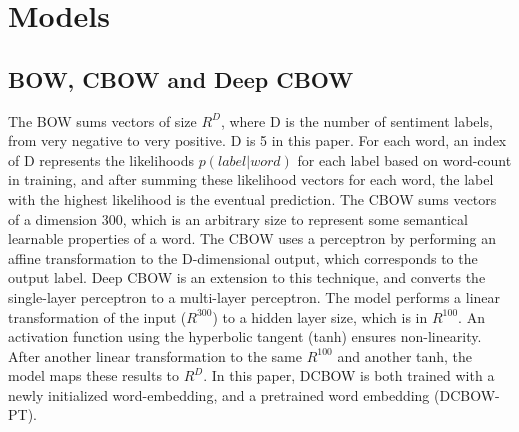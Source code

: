 \section{Models}
\label{sec: models}
\subsection{BOW, CBOW and Deep CBOW}
The BOW sums vectors of size $R^{D}$, where D is the number of sentiment labels,
from very negative to very positive. D is 5 in this paper. For each word, an
index of D represents the likelihoods $p(label|word)$ for each label based on
word-count in training, and after summing these likelihood vectors for each
word, the label with the highest likelihood is the eventual prediction. The CBOW
sums vectors of a dimension 300, which is an arbitrary size to represent some
semantical learnable properties of a word. The CBOW uses a perceptron by
performing an affine transformation to the D-dimensional output, which
corresponds to the output label. Deep CBOW is an extension to this technique,
and converts the single-layer perceptron to a multi-layer perceptron. The model
performs a linear transformation of the input ($R^{300}$) to a hidden layer
size, which is in $R^{100}$. An activation function using the hyperbolic tangent
(tanh) ensures non-linearity. After another linear transformation to the same
$R^{100}$ and another tanh, the model maps these results to $R^D$. In this
paper, DCBOW is both trained with a newly initialized word-embedding, and a
pretrained word embedding (DCBOW-PT).
